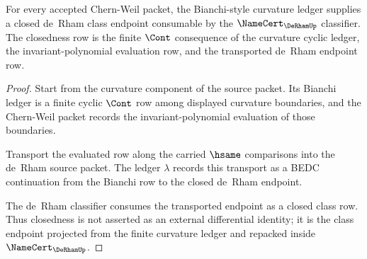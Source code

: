 \begin{theorem}
\label{thm:chernweil-closed-form-derham-class-obligation}
For every accepted Chern-Weil packet, the Bianchi-style curvature ledger supplies a closed de~Rham class endpoint consumable by the $\NameCert_{\DeRhamUp}$ classifier. The closedness row is the finite $\Cont$ consequence of the curvature cyclic ledger, the invariant-polynomial evaluation row, and the transported de~Rham endpoint row.
\end{theorem}
\begin{proof}
Start from the curvature component of the source packet. Its Bianchi ledger is a finite cyclic $\Cont$ row among displayed curvature boundaries, and the Chern-Weil packet records the invariant-polynomial evaluation of those boundaries.

Transport the evaluated row along the carried $\hsame$ comparisons into the de~Rham source packet. The ledger $\lambda$ records this transport as a BEDC continuation from the Bianchi row to the closed de~Rham endpoint.

The de~Rham classifier consumes the transported endpoint as a closed class row. Thus closedness is not asserted as an external differential identity; it is the class endpoint projected from the finite curvature ledger and repacked inside $\NameCert_{\DeRhamUp}$.
\end{proof}

